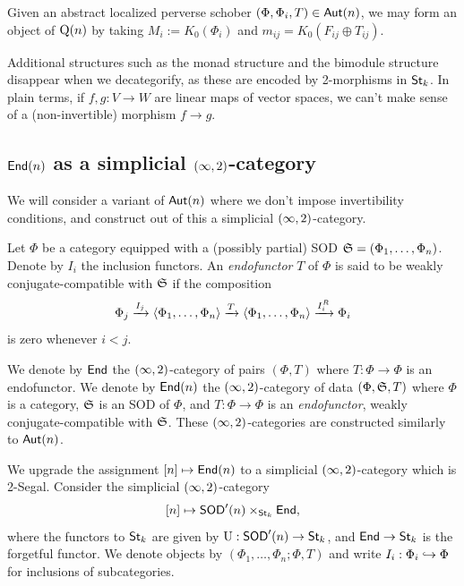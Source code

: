 \begin{prop}\label{prop:decategorification1}
    Given an abstract localized perverse schober $(\Phi,\Phi_i,T)\in\mathsf{Aut}(n)$, we may form an object of $\operatorname{Q}(n)$ by taking $M_i := K_0(\Phi_i)$ and $m_{ij} = K_0(F_{ij}\oplus T_{ij})$.
\end{prop}

\begin{rmk}
    Additional structures such as the monad structure and the bimodule structure disappear when we decategorify, as these are encoded by 2-morphisms in $\mathsf{St}_k$. In plain terms, if $f,g:V\to W$ are linear maps of vector spaces, we can't make sense of a (non-invertible) morphism $f\to g$.
\end{rmk}

\subsection{\texorpdfstring{$\mathsf{End}(n)$}{End(n)} as a simplicial \texorpdfstring{$(\infty,2)$}{2}-category}\label{subsection:simplicialend}

We will consider a variant of $\mathsf{Aut}(n)$ where we don't impose invertibility conditions, and construct out of this a simplicial $(\infty,2)$-category.

\begin{defn}
    Let $\Phi$ be a category equipped with a (possibly partial) SOD $\mathfrak{S}=(\Phi_1,\dots,\Phi_n)$. Denote by $I_i$ the inclusion functors. An \textit{endofunctor} $T$ of $\Phi$ is said to be weakly conjugate-compatible with $\mathfrak{S}$ if the composition
    \[\Phi_j\xrightarrow{I_j}\langle\Phi_1,\dots,\Phi_n\rangle\xrightarrow{T}\langle\Phi_1,\dots,\Phi_n\rangle\xrightarrow{I_i^R}\Phi_i\]
    is zero whenever $i<j$.
\end{defn}

\begin{notn}
    We denote by $\mathsf{End}$ the $(\infty,2)$-category of pairs $(\Phi,T)$ where $T:\Phi\to\Phi$ is an endofunctor. We denote by $\mathsf{End}(n)$ the $(\infty,2)$-category of data $(\Phi,\mathfrak{S},T)$ where $\Phi$ is a category, $\mathfrak{S}$ is an SOD of $\Phi$, and $T:\Phi\to\Phi$ is an \textit{endofunctor}, weakly conjugate-compatible with $\mathfrak{S}$. These $(\infty,2)$-categories are constructed similarly to $\mathsf{Aut}(n)$.
\end{notn}

We upgrade the assignment $[n]\mapsto \mathsf{End}(n)$ to a simplicial $(\infty,2)$-category which is 2-Segal. Consider the simplicial $(\infty,2)$-category
\[[n]\mapsto \mathsf{SOD}'(n)\times_{\mathsf{St}_k}\mathsf{End},\]
where the functors to $\mathsf{St}_k$ are given by $\operatorname{U}:\mathsf{SOD}'(n)\to\mathsf{St}_k$, and $\mathsf{End}\to\mathsf{St}_k$ is the forgetful functor. We denote objects by $(\Phi_1,\dots,\Phi_n;\Phi,T)$ and write $I_i:\Phi_i\hookrightarrow \Phi$ for inclusions of subcategories.

